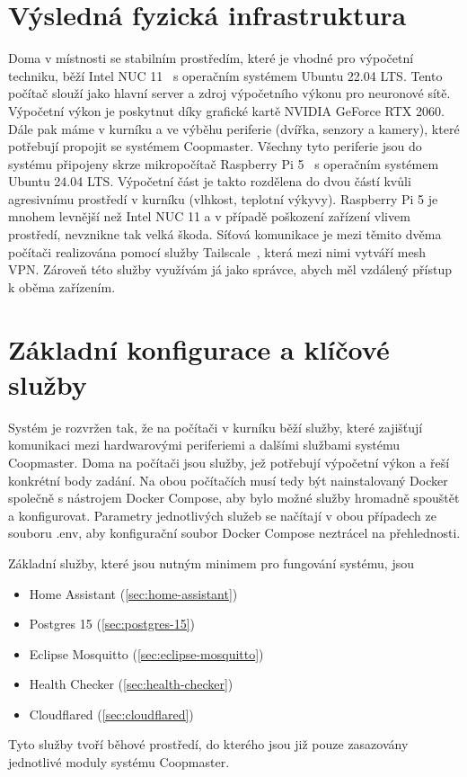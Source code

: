 \section*{Výsledná fyzická infrastruktura}

Doma v místnosti se stabilním prostředím, které je vhodné pro výpočetní techniku, běží Intel NUC 11~\cite{IntelNUC11Enthusiast} s operačním systémem Ubuntu 22.04 LTS.
Tento počítač slouží jako hlavní server a zdroj výpočetního výkonu pro neuronové sítě.
Výpočetní výkon je poskytnut díky grafické kartě NVIDIA GeForce RTX 2060.\newline
Dále pak máme v kurníku a ve výběhu periferie (dvířka, senzory a kamery), které potřebují propojit se systémem Coopmaster.
Všechny tyto periferie jsou do systému připojeny skrze mikropočítač Raspberry Pi 5~\cite{RaspberryPi5} s operačním systémem Ubuntu 24.04 LTS.
Výpočetní část je takto rozdělena do dvou částí kvůli agresivnímu prostředí v kurníku (vlhkost, teplotní výkyvy).
Raspberry Pi 5 je mnohem levnější než Intel NUC 11 a v případě poškození zařízení vlivem prostředí, nevznikne tak velká škoda.
Síťová komunikace je mezi těmito dvěma počítači realizována pomocí služby Tailscale~\cite{Tailscale}, která mezi nimi vytváří mesh VPN.
Zároveň této služby využívám já jako správce, abych měl vzdálený přístup k oběma zařízením.

\section*{Základní konfigurace a klíčové služby}


Systém je rozvržen tak, že na počítači v kurníku běží služby, které zajišťují komunikaci mezi hardwarovými periferiemi a dalšími službami systému Coopmaster.
Doma na počítači jsou služby, jež potřebují výpočetní výkon a řeší konkrétní body zadání.
Na obou počítačích musí tedy být nainstalovaný Docker společně s nástrojem Docker Compose, aby bylo možné služby hromadně spouštět a konfigurovat.
Parametry jednotlivých služeb se načítají v obou případech ze souboru .env, aby konfigurační soubor Docker Compose neztrácel na přehlednosti.\newline

Základní služby, které jsou nutným minimem pro fungování systému, jsou
\begin{itemize}
    \item Home Assistant (\ref{sec:home-assistant})
    \item Postgres 15 (\ref{sec:postgres-15})
    \item Eclipse Mosquitto (\ref{sec:eclipse-mosquitto})
    \item Health Checker (\ref{sec:health-checker})
    \item Cloudflared (\ref{sec:cloudflared})
\end{itemize}
Tyto služby tvoří běhové prostředí, do kterého jsou již pouze zasazovány jednotlivé moduly systému Coopmaster.

